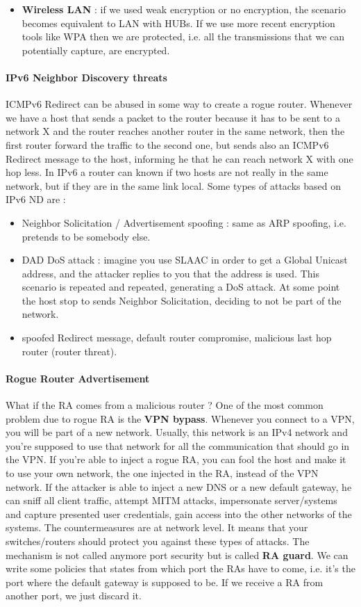 \documentclass[11pt]{article}
\begin{document}
\begin{itemize}
\begin{itemize}
\end{itemize}
\item \textbf{Wireless LAN} : if we used weak encryption or no encryption, the scenario becomes equivalent to LAN with HUBs. If we use more recent encryption tools like WPA then we are protected, i.e. all the transmissions that we can potentially capture, are encrypted.
\end{itemize}
\paragraph{IPv6 Neighbor Discovery threats} ICMPv6 Redirect can be abused in some way to create a rogue router. Whenever we have a host that sends a packet to the router because it has to be sent to a network X and the router reaches another router in the same network, then the first router forward the traffic to the second one, but sends also an ICMPv6 Redirect message to the host, informing he that he can reach network X with one hop less. In IPv6 a router can known if two hosts are not really in the same network, but if they are in the same link local. Some types of attacks based on IPv6 ND are :
\begin{itemize}
\item Neighbor Solicitation / Advertisement spoofing : same as ARP spoofing, i.e. pretends to be somebody else.
\item DAD DoS attack : imagine you use SLAAC in order to get a Global Unicast address, and the attacker replies to you that the address is used. This scenario is repeated and repeated, generating a DoS attack. At some point the host stop to sends Neighbor Solicitation, deciding to not be part of the network.
\item spoofed Redirect message, default router compromise, malicious last hop router (router threat).
\end{itemize}
\paragraph{Rogue Router Advertisement} What if the RA comes from a malicious router ? One of the most common problem due to rogue RA is the \textbf{VPN bypass}. Whenever you connect to a VPN, you will be part of a new network. Usually, this network is an IPv4 network and you're supposed to use that network for all the communication that should go in the VPN. If you're able to inject a rogue RA, you can fool the host and make it to use your own network, the one injected in the RA, instead of the VPN network. If the attacker is able to inject a new DNS or a new default gateway, he can sniff all client traffic, attempt MITM attacks, impersonate server/systems and capture presented user credentials, gain access into the other networks of the systems. The countermeasures are at network level. It means that your switches/routers should protect you against these types of attacks. The mechanism is not called anymore port security but is called \textbf{RA guard}. We can write some policies that states from which port the RAs have to come, i.e. it's the port where the default gateway is supposed to be. If we receive a RA from another port, we just discard it.
\end{document}
